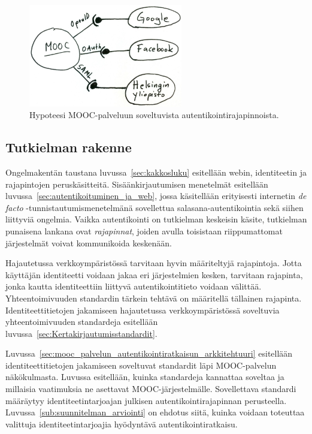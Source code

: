 \documentclass[finnish,gradu]{tktltiki}
\begin{document}
\begin{figure}
  \centering
  \includegraphics[width=0.6\textwidth]{images/mooc-autentikointirajapinnat.jpg}
  \caption{Hypoteesi MOOC-palveluun soveltuvista autentikointirajapinnoista.}
  \label{fig:mooc-autentikointirajapinnat}
\end{figure}




\subsection{Tutkielman rakenne} %
\label{sub:tutkielman_rakenne}

  Ongelmakentän taustana luvussa~\ref{sec:kakkosluku} esitellään webin, identiteetin ja rajapintojen peruskäsitteitä. Sisäänkirjautumisen menetelmät esitellään luvussa~\ref{sec:autentikoituminen_ja_web}, jossa käsitellään erityisesti internetin \emph{de facto} -tun\-nistau\-tumisme\-ne\-tel\-mänä sovellettua salasana-autentikointia sekä siihen liittyviä ongelmia. Vaikka autentikointi on tutkielman keskeisin käsite, tutkielman punaisena lankana ovat \emph{rajapinnat}, joiden avulla toisistaan riippumattomat järjestelmät voivat kommunikoida keskenään.

  Hajautetussa verkkoympäristössä tarvitaan hyvin määriteltyjä rajapintoja. Jotta käyttäjän identiteetti voidaan jakaa eri järjestelmien kesken, tarvitaan rajapinta, jonka kautta identiteettiin liittyvä autentikointitieto voidaan välittää. Yhteentoimivuuden standardin tärkein tehtävä on määritellä tällainen rajapinta. Identiteettitietojen jakamiseen hajautetussa verkkoympäristössä soveltuvia yhteentoimivuuden standardeja esitellään luvussa~\ref{sec:Kertakirjautumisstandardit}.

  Luvussa~\ref{sec:mooc_palvelun_autentikointiratkaisun_arkkitehtuuri} esitellään identiteettitietojen jakamiseen soveltuvat standardit läpi MOOC-palvelun näkökulmasta. Luvussa esitellään, kuinka standardeja kannattaa soveltaa ja millaisia vaatimuksia ne asettavat MOOC-järjestelmälle. Sovellettava standardi määräytyy identiteetintarjoajan julkisen autentikointirajapinnan perusteella. Luvussa~\ref{sub:suunnitelman_arviointi} on ehdotus siitä, kuinka voidaan toteuttaa valittuja identiteetintarjoajia hyödyntävä autentikointiratkaisu.
\end{document}
